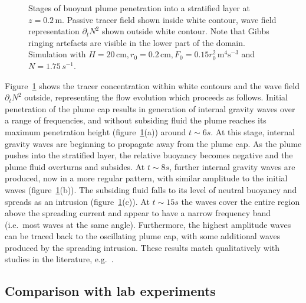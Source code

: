 \documentclass[a4paper]{article}
\begin{document}
\begin{figure}
	\centering
	\caption{Stages of buoyant plume penetration into a stratified layer at $z=0.2\, \mathrm{m}$. Passive
	tracer field shown inside white contour, wave field representation $\partial_t N^2$ shown outside
	white contour. Note that Gibbs ringing artefacts are visible in the lower part of the domain. Simulation
	with $H = 20\,\mathrm{cm}, r_0 = 0.2 \, \mathrm{cm}, F_0 = 0.15r_0^2 \, \mathrm{m}^4 \mathrm{s}^{-3}$ and
	$N = 1.75\, s^{-1}$.}
	\label{fig:evol}
\end{figure}

Figure~\ref{fig:evol} shows the tracer concentration within white contours and the wave field $\partial_t N^2$
outside, representing the flow evolution which proceeds as follows. Initial penetration of the plume cap
results in generation of internal gravity waves over a range of frequencies, and without subsiding fluid the
plume reaches its maximum penetration height (figure~\ref{fig:evol}(a)) around $t \sim 6 s$. At this stage,
internal gravity waves are beginning to propagate away from the plume cap. As the plume pushes into the
stratified layer, the relative buoyancy becomes negative and the plume fluid overturns and subsides. At $t
\sim 8 s$, further internal gravity waves are produced, now in a more regular pattern, with similar amplitude
to the initial waves (figure~\ref{fig:evol}(b)). The subsiding fluid falls to its level of neutral buoyancy
and spreads as an intrusion (figure~\ref{fig:evol}(c)). At $t \sim 15 s$ the waves cover the entire region
above the spreading current and appear to have a narrow frequency band (i.e.\ most waves at the same angle).
Furthermore, the highest amplitude waves can be traced back to the oscillating plume cap, with some additional
waves produced by the spreading intrusion. These results match qualitatively with studies in the literature,
e.g.\ \citet{ansong2010, hunt2015, devenish2010}.

\subsection{Comparison with lab experiments}
\end{document}
